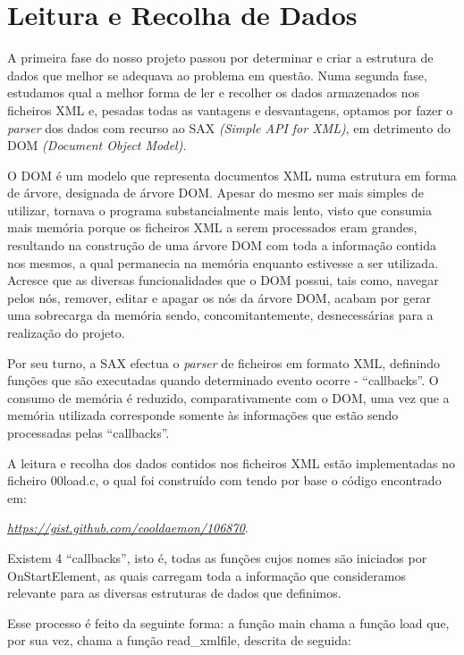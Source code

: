 \documentclass[a4paper]{report}
\begin{document}
\section{Leitura e Recolha de Dados}

A primeira fase do nosso projeto passou por determinar e criar a estrutura de dados
que melhor se adequava ao problema em questão.
Numa segunda fase, estudamos qual a melhor forma de ler e recolher os dados armazenados
nos ficheiros XML e, pesadas todas as vantagens e desvantagens, optamos por fazer o
\textit{parser} dos dados com recurso ao SAX \textit{(Simple API for XML)},
em detrimento do DOM \textit{(Document Object Model)}. \par
O DOM é um modelo que representa documentos XML numa estrutura
em forma de árvore, designada de árvore DOM. Apesar do mesmo ser mais simples de utilizar,
tornava o programa substancialmente mais lento, visto que consumia mais memória porque os ficheiros
XML a serem processados eram grandes, resultando na construção de uma árvore DOM com toda a informação
contida nos mesmos, a qual permanecia na memória enquanto estivesse a ser utilizada. Acresce que
as diversas funcionalidades que o DOM possui, tais como, navegar pelos nós, remover, editar e apagar
os nós da árvore DOM, acabam por gerar uma sobrecarga da memória sendo, concomitantemente,
desnecessárias para a realização do projeto. \par
Por seu turno, a SAX efectua o \textit{parser} de ficheiros em formato XML, definindo
funções que são executadas quando determinado evento ocorre - ``callbacks''. O consumo de memória
é reduzido, comparativamente com o DOM, uma vez que a memória utilizada corresponde somente às
informações que estão sendo processadas pelas ``callbacks''. \par

A leitura e recolha dos dados contidos nos ficheiros XML estão implementadas no
ficheiro 00load.c, o qual foi construído com tendo por base o código encontrado em:
\begin{center}
\href{https://gist.github.com/cooldaemon/106870}{\emph{https://gist.github.com/cooldaemon/106870}}.
\end{center}

Existem 4 ``callbacks'', isto é, todas as funções cujos nomes são
iniciados por OnStartElement, as quais carregam toda a informação que consideramos
relevante para as diversas estruturas de dados que definimos. \par
Esse processo é feito da seguinte forma: a função main chama a função load que,
por sua vez, chama a função read\_xmlfile, descrita de seguida:
\end{document}
